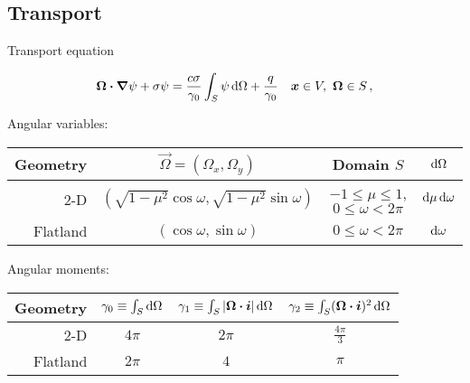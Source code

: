 \documentclass{beamer}
\begin{document}
\subsection{Transport}
\begin{frame}{Transport equation}

\begin{equation}\label{eq:generalTransport}
  \bm{\Omega}\bm{\cdot} \bm{\nabla} \psi + \sigma \psi
  = \frac{c \sigma}{\gamma_0} \int_{S} \psi \mathop{}\!\mathrm{d}\Omega + \frac{q}{\gamma_0}
  \quad \bm{x}\in V,\ \bm{\Omega}\in S \,,
\end{equation}

  \vspace{2ex}

  \small
  \centering
  Angular variables:
  \begin{tabular}{rccc}
\toprule
   Geometry & $\vec{\Omega}=(\Omega_x, \Omega_y)$ & Domain $S$ & $\mathop{}\!\mathrm{d}\Omega$
\\ \midrule
2-D & $( \sqrt{1-\mu^2} \cos \omega,
   \sqrt{1-\mu^2} \sin \omega)$
   & $-1 \le \mu \le 1$, $0 \le \omega < 2\pi$ & $\mathop{}\!\mathrm{d}\mu \mathop{}\!\mathrm{d} \omega$
   \\
   Flatland & $ ( \cos \omega, \sin \omega )$
   & $0 \le \omega < 2\pi$ & $\mathop{}\!\mathrm{d} \omega$
\\ \bottomrule
  \end{tabular}

  \vspace{2ex}

Angular moments:
  \centering
  \begin{tabular}{rccc}
\toprule
   Geometry
   & $\gamma_0 \equiv \int_S \mathop{}\!\mathrm{d}\Omega$
   & $\gamma_1 \equiv \int_S \left| \bm{\Omega}\bm{\cdot}\bm{i} \right| \mathop{}\!\mathrm{d}\Omega$
   & $\gamma_2 \equiv \int_S (\bm{\Omega}\bm{\cdot}\bm{i})^2 \mathop{}\!\mathrm{d}\Omega$
\\ \midrule
   2-D & $4\pi$ & $2\pi$ & $\frac{4\pi}{3}$
   \\
   Flatland & $2\pi$ & $4$ & $\pi$
\\ \bottomrule
  \end{tabular}

\end{frame}
\end{document}
